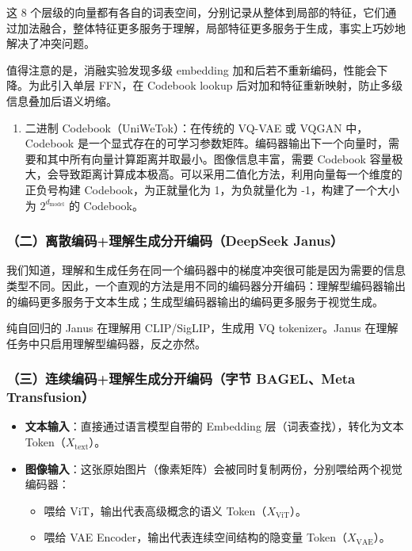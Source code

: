 这 8 个层级的向量都有各自的词表空间，分别记录从整体到局部的特征，它们通过加法融合，整体特征更多服务于理解，局部特征更多服务于生成，事实上巧妙地解决了冲突问题。

值得注意的是，消融实验发现多级 embedding 加和后若不重新编码，性能会下降。为此引入单层 FFN，在 Codebook lookup 后对加和特征重新映射，防止多级信息叠加后语义坍缩。

\begin{enumerate}
\def\labelenumi{\arabic{enumi}.}
\setcounter{enumi}{1}
\tightlist
\item
  二进制 Codebook（UniWeTok）：在传统的 VQ-VAE 或 VQGAN 中，Codebook 是一个显式存在的可学习参数矩阵。编码器输出下一个向量时，需要和其中所有向量计算距离并取最小。图像信息丰富，需要 Codebook 容量极大，会导致距离计算成本极高。可以采用二值化方法，利用向量每一个维度的正负号构建 Codebook，为正就量化为 1，为负就量化为 -1，构建了一个大小为 \(2^{d_{\mathrm{model}}}\) 的 Codebook。
\end{enumerate}

\hypertarget{ux4e8cux79bbux6563ux7f16ux7801ux7406ux89e3ux751fux6210ux5206ux5f00ux7f16ux7801deepseek-janus}{%
\subsubsection{（二）离散编码+理解生成分开编码（DeepSeek Janus）}\label{ux4e8cux79bbux6563ux7f16ux7801ux7406ux89e3ux751fux6210ux5206ux5f00ux7f16ux7801deepseek-janus}}

我们知道，理解和生成任务在同一个编码器中的梯度冲突很可能是因为需要的信息类型不同。因此，一个直观的方法是用不同的编码器分开编码：理解型编码器输出的编码更多服务于文本生成；生成型编码器输出的编码更多服务于视觉生成。

纯自回归的 Janus 在理解用 CLIP/SigLIP，生成用 VQ tokenizer。Janus 在理解任务中只启用理解型编码器，反之亦然。

\hypertarget{ux4e09ux8fdeux7eedux7f16ux7801ux7406ux89e3ux751fux6210ux5206ux5f00ux7f16ux7801ux5b57ux8282-bagelmeta-transfusion}{%
\subsubsection{（三）连续编码+理解生成分开编码（字节 BAGEL、Meta Transfusion）}\label{ux4e09ux8fdeux7eedux7f16ux7801ux7406ux89e3ux751fux6210ux5206ux5f00ux7f16ux7801ux5b57ux8282-bagelmeta-transfusion}}

\begin{itemize}
\tightlist
\item
  \textbf{文本输入}：直接通过语言模型自带的 Embedding 层（词表查找），转化为文本 Token（\(X_{\mathrm{text}}\)）。
\item
  \textbf{图像输入}：这张原始图片（像素矩阵）会被同时复制两份，分别喂给两个视觉编码器：

  \begin{itemize}
  \tightlist
  \item
    喂给 ViT，输出代表高级概念的语义 Token（\(X_{\mathrm{ViT}}\)）。
  \item
    喂给 VAE Encoder，输出代表连续空间结构的隐变量 Token（\(X_{\mathrm{VAE}}\)）。
  \end{itemize}
\end{itemize}

